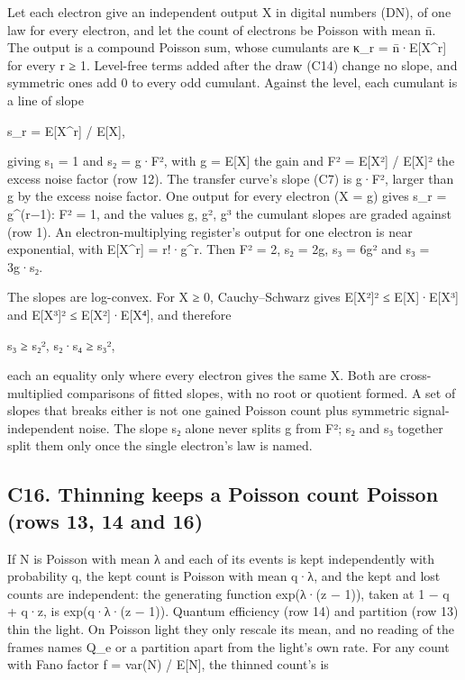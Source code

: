 Let each electron give an independent output X in digital numbers (DN), of one law for every electron, and let the count of electrons be Poisson with mean n̄. The output is a compound Poisson sum, whose cumulants are κ\_\allowbreak{}r = n̄·E[X\textasciicircum{}r] for every r ≥ 1. Level-free terms added after the draw (C14) change no slope, and symmetric ones add 0 to every odd cumulant. Against the level, each cumulant is a line of slope

s\_\allowbreak{}r = E[X\textasciicircum{}r] / E[X],

giving s₁ = 1 and s₂ = g·F², with g = E[X] the gain and F² = E[X²] / E[X]² the excess noise factor (row 12). The transfer curve's slope (C7) is g·F², larger than g by the excess noise factor. One output for every electron (X = g) gives s\_\allowbreak{}r = g\textasciicircum{}(r−1): F² = 1, and the values g, g², g³ the cumulant slopes are graded against (row 1). An electron-multiplying register's output for one electron is near exponential, with E[X\textasciicircum{}r] = r!·g\textasciicircum{}r. Then F² = 2, s₂ = 2g, s₃ = 6g² and s₃ = 3g·s₂.

The slopes are log-convex. For X ≥ 0, Cauchy–Schwarz gives E[X²]² ≤ E[X]·E[X³] and E[X³]² ≤ E[X²]·E[X⁴], and therefore

s₃ ≥ s₂²,  s₂·s₄ ≥ s₃²,

each an equality only where every electron gives the same X. Both are cross-multiplied comparisons of fitted slopes, with no root or quotient formed. A set of slopes that breaks either is not one gained Poisson count plus symmetric signal-independent noise. The slope s₂ alone never splits g from F²; s₂ and s₃ together split them only once the single electron's law is named.

\subsection{\texorpdfstring{C16. Thinning keeps a Poisson count Poisson (rows 13, 14 and 16)}{C16. Thinning keeps a Poisson count Poisson (rows 13, 14 and 16)}}

If N is Poisson with mean λ and each of its events is kept independently with probability q, the kept count is Poisson with mean q·λ, and the kept and lost counts are independent: the generating function exp(λ·(z − 1)), taken at 1 − q + q·z, is exp(q·λ·(z − 1)). Quantum efficiency (row 14) and partition (row 13) thin the light. On Poisson light they only rescale its mean, and no reading of the frames names Q\_\allowbreak{}e or a partition apart from the light's own rate. For any count with Fano factor f = var(N) / E[N], the thinned count's is

